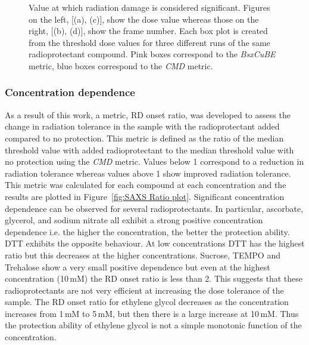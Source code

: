 \begin{figure}
\begin{subfigure}[b]{0.45\textwidth}
            \caption{}
            \label{fig:SAXS frame- 10mM}
    \end{subfigure}
    \caption{Value at which radiation damage is considered significant. Figures on the left, [(a), (c)], show the dose value whereas those on the right, [(b), (d)], show the frame number. Each box plot is created from the threshold dose values for three different runs of the same radioprotectant compound. Pink boxes correspond to the \textit{BsxCuBE} metric, blue boxes correspond to the \textit{CMD} metric.}
    \label{fig:SAXS dose vs frame}
\end{figure}

\subsubsection{Concentration dependence}
\label{subs:Concentration dependence}
As a result of this work, a metric, RD onset ratio, was developed to assess the change in radiation tolerance in the sample with the radioprotectant added compared to no protection.
This metric is defined as the ratio of the median threshold value with added radioprotectant to the median threshold value with no protection using the \textit{CMD} metric.
Values below 1 correspond to a reduction in radiation tolerance whereas values above 1 show improved radiation tolerance.
This metric was calculated for each compound at each concentration and the results are plotted in Figure~\ref{fig:SAXS Ratio plot}.
Significant concentration dependence can be observed for several radioprotectants.
In particular, ascorbate, glycerol, and sodium nitrate all exhibit a strong positive concentration dependence i.e. the higher the concentration, the better the protection ability.
DTT exhibits the opposite behaviour.
At low concentrations DTT has the highest ratio but this decreases at the higher concentrations.
Sucrose, TEMPO and Trehalose show a very small positive dependence but even at the highest concentration (10\,mM) the RD onset ratio is less than 2.
This suggests that these radioprotectants are not very efficient at increasing the dose tolerance of the sample.
The RD onset ratio for ethylene glycol decreases as the concentration increases from 1\,mM to 5\,mM, but then there is a large increase at 10$\,$mM.
Thus the protection ability of ethylene glycol is not a simple monotonic function of the concentration.
